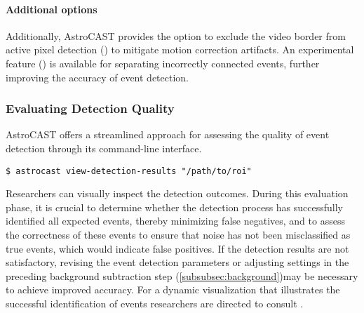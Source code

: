 \paragraph{Additional options}
Additionally, AstroCAST provides the option to exclude the video border from active pixel detection () to mitigate motion correction artifacts. An experimental feature () is available for separating incorrectly connected events, further improving the accuracy of event detection.


\subsubsection{Evaluating Detection Quality}
AstroCAST offers a streamlined approach for assessing the quality of event detection through its command-line interface.

\begin{lstlisting}[style=bashStyle]
    $ astrocast view-detection-results "/path/to/roi"
\end{lstlisting}

Researchers can visually inspect the detection outcomes. During this evaluation phase, it is crucial to determine whether the detection process has successfully identified all expected events, thereby minimizing false negatives, and to assess the correctness of these events to ensure that noise has not been misclassified as true events, which would indicate false positives. If the detection results are not satisfactory, revising the event detection parameters or adjusting settings in the preceding background subtraction step (\ref{subsubsec:background})may be necessary to achieve improved accuracy. For a dynamic visualization that illustrates the successful identification of events researchers are directed to consult .